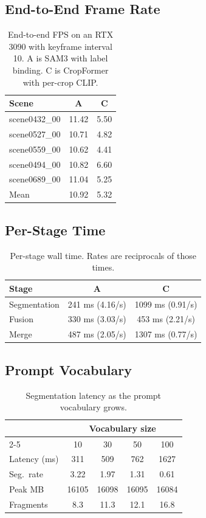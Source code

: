 \documentclass[10pt,letterpaper]{article}
\begin{document}
\subsection{End-to-End Frame Rate}
\begin{table}[H]
\centering
\caption{End-to-end FPS on an RTX 3090 with keyframe interval 10.
A is SAM3 with label binding.
C is CropFormer with per-crop CLIP.}
\label{tab:fps}
\begin{tabular}{lcc}
\toprule
Scene & A & C \\
\midrule
scene0432\_00 & 11.42 & 5.50 \\
scene0527\_00 & 10.71 & 4.82 \\
scene0559\_00 & 10.62 & 4.41 \\
scene0494\_00 & 10.82 & 6.60 \\
scene0689\_00 & 11.04 & 5.25 \\
Mean & 10.92 & 5.32 \\
\bottomrule
\end{tabular}
\end{table}

\subsection{Per-Stage Time}
\begin{table}[H]
\centering
\caption{Per-stage wall time.
Rates are reciprocals of those times.}
\label{tab:stages}
\begin{tabular}{lcc}
\toprule
Stage & A & C \\
\midrule
Segmentation & 241 ms (4.16/s) & 1099 ms (0.91/s) \\
Fusion & 330 ms (3.03/s) & 453 ms (2.21/s) \\
Merge & 487 ms (2.05/s) & 1307 ms (0.77/s) \\
\bottomrule
\end{tabular}
\end{table}

\subsection{Prompt Vocabulary}
\begin{table}[H]
\centering
\caption{Segmentation latency as the prompt vocabulary grows.}
\label{tab:vocab}
\begin{tabular}{lcccc}
\toprule
 & \multicolumn{4}{c}{Vocabulary size} \\
\cmidrule(lr){2-5}
 & 10 & 30 & 50 & 100 \\
\midrule
Latency (ms) & 311 & 509 & 762 & 1627 \\
Seg.\ rate & 3.22 & 1.97 & 1.31 & 0.61 \\
Peak MB & 16105 & 16098 & 16095 & 16084 \\
Fragments & 8.3 & 11.3 & 12.1 & 16.8 \\
\bottomrule
\end{tabular}
\end{table}
\end{document}
